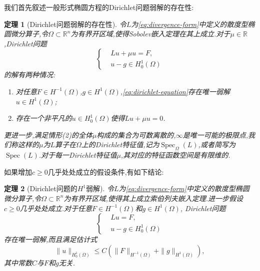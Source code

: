 \documentclass[a4paper,punct=banjiao,twoside]{ctexrep}
\theoremstyle{plain}
\newtheorem{thm}{定理}[chapter]
\theoremstyle{definition}
\theoremstyle{remark}
\begin{document}
我们首先叙述一般形式椭圆方程的Dirichlet问题弱解的存在性:
\begin{thm}[Dirichlet问题弱解的存在性{\cite{Chen2elliptic}}]\label{thm:weak-solution}
令$L$为\eqref{eq:divergence-form}中定义的散度型椭圆微分算子,令$\Omega\subset\mathbb{R}^n$为有界开区域,使得Sobolev嵌入定理在其上成立.对于$\mu\in\mathbb{R}$,Dirichlet问题
\begin{equation}\label{eq:dirichlet-equation}
\left\{\begin{aligned}
& Lu+\mu u = F,\\
& u-g\in H_0^1(\Omega)\end{aligned}\right.
\end{equation}
的解有两种情况:
\begin{enumerate}[(1)]
\item 对任意$F\in H^{-1}(\Omega)$,$g\in H^{1}(\Omega)$,\eqref{eq:dirichlet-equation}存在唯一弱解$u\in H^1(\Omega)$;
\item 存在一个非平凡的$u\in H^1_0(\Omega)$使得$Lu+\mu u=0$.
\end{enumerate}
更进一步,满足情形(2)的全体$\mu$构成的集合为可数离散的,$\infty$是唯一可能的极限点,我们称这样的$\mu$为$L$算子在$\Omega$上的Dirichlet特征值,记为$\operatorname{Spec}_{\Omega}(L)$,或者简写为$\operatorname{Spec}(L)$.对于每一Dirichlet特征值$\mu$,其对应的特征函数空间是有限维的.
\end{thm}

如果增加$c\geq 0$几乎处处成立的假设条件,有如下结论:
\begin{thm}[Dirichlet问题的$H^1$弱解{\cite{Chen2elliptic}}]\label{thm:regularity}
令$L$为\eqref{eq:divergence-form}中定义的散度型椭圆微分算子,令$\Omega\subset\mathbb{R}^n$为有界开区域,使得其上成立索伯列夫嵌入定理.进一步假设$c\geq 0$几乎处处成立.对于任意$F\in H^{-1}(\Omega)$和$g\in H^1(\Omega)$, Dirichlet问题
\begin{equation}
\left\{\begin{aligned}
&Lu = F, \\
& u-g\in H^{1}_{0}(\Omega)
\end{aligned}\right.
\end{equation}
存在唯一弱解,而且满足估计式
\begin{equation}
\|u\|_{H^1_0(\Omega)} \leq C\left(\|F\|_{H^{-1}(\Omega)} +\|g\|_{H^1(\Omega)} \right),
\end{equation}
其中常数$C$与$F$和$g$无关.
\end{thm}
\end{document}

